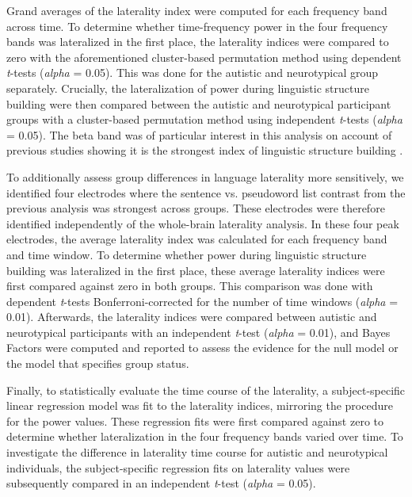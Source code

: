 Grand averages of the laterality index were computed for each frequency band across time. To determine whether time-frequency power in the four frequency bands was lateralized in the first place, the laterality indices were compared to zero with the aforementioned cluster-based permutation method using dependent \textit{t}-tests (\textit{alpha} = 0.05). This was done for the autistic and neurotypical group separately. Crucially, the lateralization of power during linguistic structure building were then compared between the autistic and neurotypical participant groups with a cluster-based permutation method using independent \textit{t}-tests (\textit{alpha} = 0.05). The beta band was of particular interest in this analysis on account of previous studies showing it is the strongest index of linguistic structure building \citep{bastiaansen2010,bastiaansen2015}. 

To additionally assess group differences in language laterality more sensitively, we identified four electrodes where the sentence vs. pseudoword list contrast from the previous analysis was strongest across groups. These electrodes were therefore identified independently of the whole-brain laterality analysis. In these four peak electrodes, the average laterality index was calculated for each frequency band and time window. To determine whether power during linguistic structure building was lateralized in the first place, these average laterality indices were first compared against zero in both groups. This comparison was done with dependent \textit{t}-tests Bonferroni-corrected for the number of time windows (\textit{alpha} = 0.01). Afterwards, the laterality indices were compared between autistic and neurotypical participants with an independent \textit{t}-test (\textit{alpha} = 0.01), and Bayes Factors were computed and reported to assess the evidence for the null model or the model that specifies group status.

Finally, to statistically evaluate the time course of the laterality, a subject-specific linear regression model was fit to the laterality indices, mirroring the procedure for the power values. These regression fits were first compared against zero to determine whether lateralization in the four frequency bands varied over time. To investigate the difference in laterality time course for autistic and neurotypical individuals, the subject-specific regression fits on laterality values were subsequently compared in an independent \textit{t}-test (\textit{alpha} = 0.05). 

